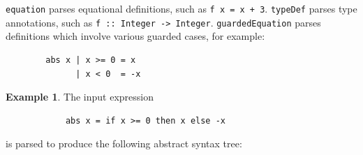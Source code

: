 \documentclass[12pt, a4paper]{report}
\theoremstyle{definition}
\newtheorem{example}{Example}[section]
\begin{document}
	\texttt{equation} parses equational definitions, such as \texttt{f x = x + 3}. \texttt{typeDef} parses type annotations, such as \texttt{f :: Integer -> Integer}. \texttt{guardedEquation} parses definitions which involve various guarded cases, for example:
	\begin{verbatim}
		abs x | x >= 0 = x
		      | x < 0  = -x
	\end{verbatim}
	
	\vspace{-12pt}
	
	\begin{example}
		The input expression
		\begin{verbatim}
			abs x = if x >= 0 then x else -x
		\end{verbatim}
		is parsed to produce the following abstract syntax tree:
		\vspace{12pt}
		
	\end{example}
	
\end{document}
